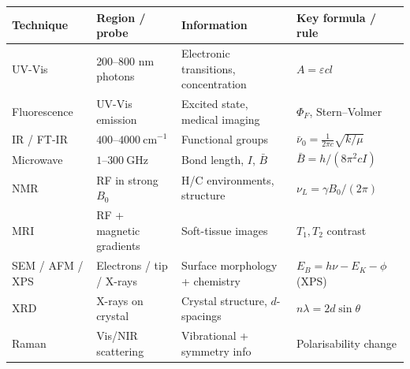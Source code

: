 \documentclass[12pt,a4paper]{article}
\begin{document}
\begin{tcolorbox}[tikzbox, title={Summary Reference Table of Spectroscopic Techniques}]
\begin{tabularx}{\linewidth}{|B{3.0cm}|Y|Y|Y|}
\hline
\textbf{Technique} & \textbf{Region / probe} & \textbf{Information} & \textbf{Key formula / rule} \\
\hline
UV-Vis & 200--800 nm photons & Electronic transitions, concentration & $A=\varepsilon c l$ \\
\hline
Fluorescence & UV-Vis emission & Excited state, medical imaging & $\Phi_F$, Stern--Volmer \\
\hline
IR / FT-IR & $400$--$4000\ \mathrm{cm^{-1}}$ & Functional groups & $\bar{\nu}_0=\frac{1}{2\pi c}\sqrt{k/\mu}$ \\
\hline
Microwave & $1$--$300\ \mathrm{GHz}$ & Bond length, $I$, $\bar{B}$ & $\bar{B}=h/(8\pi^{2}cI)$ \\
\hline
NMR & RF in strong $B_0$ & H/C environments, structure & $\nu_L=\gamma B_0/(2\pi)$ \\
\hline
MRI & RF + magnetic gradients & Soft-tissue images & $T_1, T_2$ contrast \\
\hline
SEM / AFM / XPS & Electrons / tip / X-rays & Surface morphology + chemistry & $E_B=h\nu-E_K-\phi$ (XPS) \\
\hline
XRD & X-rays on crystal & Crystal structure, $d$-spacings & $n\lambda=2d\sin\theta$ \\
\hline
Raman & Vis/NIR scattering & Vibrational + symmetry info & Polarisability change \\
\hline
\end{tabularx}
\end{tcolorbox}
\end{document}
